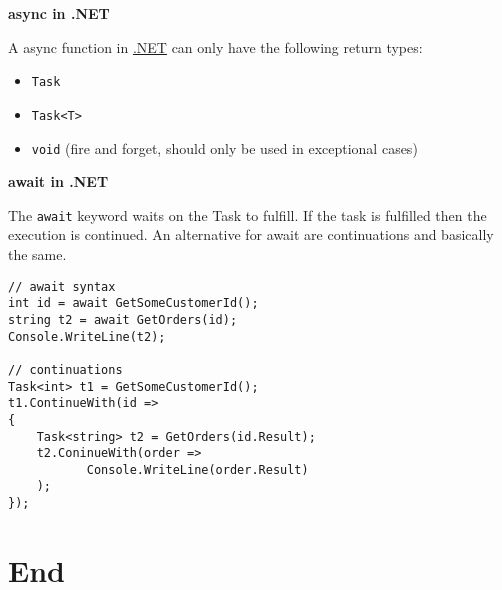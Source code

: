 \documentclass[11pt,twoside,landscape]{article}
\begin{document}
\begin{multicols}{3}
\textbf{async in .NET}

A async function in \href{../../../roam/20211003114703-net.org}{.NET} can only have the following return types:
\begin{itemize}
\item \texttt{Task}
\item \texttt{Task<T>}
\item \texttt{void} (fire and forget, should only be used in exceptional cases)
\end{itemize}


\textbf{await in .NET}

The \texttt{await} keyword waits on the Task to fulfill.
If the task is fulfilled then the execution is continued.
An alternative for await are continuations and basically the same.

\lstset{language=csharp,label= ,caption= ,captionpos=b,numbers=none}
\begin{lstlisting}
// await syntax
int id = await GetSomeCustomerId();
string t2 = await GetOrders(id);
Console.WriteLine(t2);

// continuations
Task<int> t1 = GetSomeCustomerId();
t1.ContinueWith(id =>
{
    Task<string> t2 = GetOrders(id.Result);
    t2.ConinueWith(order =>
		   Console.WriteLine(order.Result)
    );
});
\end{lstlisting}


\section{End}
\label{sec:org3f54530}
\end{multicols}
\end{document}

